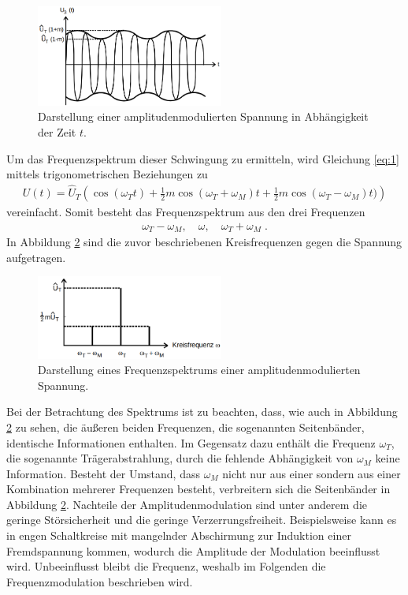 \begin{figure}
    \centering
    \includegraphics[width=0.55\textwidth]{ressources/T1.png}
    \caption{Darstellung einer amplitudenmodulierten Spannung in Abhängigkeit der Zeit $t$\cite{skript}.}
    \label{fig_T1}
\end{figure}

Um das Frequenzspektrum dieser Schwingung zu ermitteln, wird Gleichung \eqref{eq:1} mittels trigonometrischen Beziehungen zu
\begin{align}
	U(t)=\hat{U}_T\left(\cos{(\omega_Tt)+\frac{1}{2}m\cos{(\omega_T+\omega_M)t}}+\frac{1}{2}m\cos{(\omega_T-\omega_M)t})\right)
\end{align}
vereinfacht. Somit besteht das Frequenzspektrum aus den drei Frequenzen
\begin{align}
	\omega_T-\omega_M,\quad\omega,\quad\omega_T+\omega_M\;.
\end{align}
In Abbildung \ref{fig_T2} sind die zuvor beschriebenen Kreisfrequenzen gegen die Spannung aufgetragen.

\begin{figure}
    \centering
    \includegraphics[width=0.55\textwidth]{ressources/T2.png}
    \caption{Darstellung eines Frequenzspektrums einer amplitudenmodulierten Spannung\cite{skript}.}
    \label{fig_T2}
\end{figure}

Bei der Betrachtung des Spektrums ist zu beachten, dass, wie auch in Abbildung \ref{fig_T2} zu sehen, die äußeren beiden Frequenzen, die sogenannten Seitenbänder, identische Informationen enthalten. Im Gegensatz dazu enthält die Frequenz $\omega_T$, die sogenannte Trägerabstrahlung, durch die fehlende Abhängigkeit von $\omega_M$ keine Information. Besteht der Umstand, dass $\omega_M$ nicht nur aus einer sondern aus einer Kombination mehrerer Frequenzen besteht, verbreitern sich die Seitenbänder in Abbildung \ref{fig_T2}. Nachteile der Amplitudenmodulation sind unter anderem die geringe Störsicherheit und die geringe Verzerrungsfreiheit. Beispielsweise kann es in engen Schaltkreise mit mangelnder Abschirmung zur Induktion einer Fremdspannung kommen, wodurch die Amplitude der Modulation beeinflusst wird. Unbeeinflusst bleibt die Frequenz, weshalb im Folgenden die Frequenzmodulation beschrieben wird.

